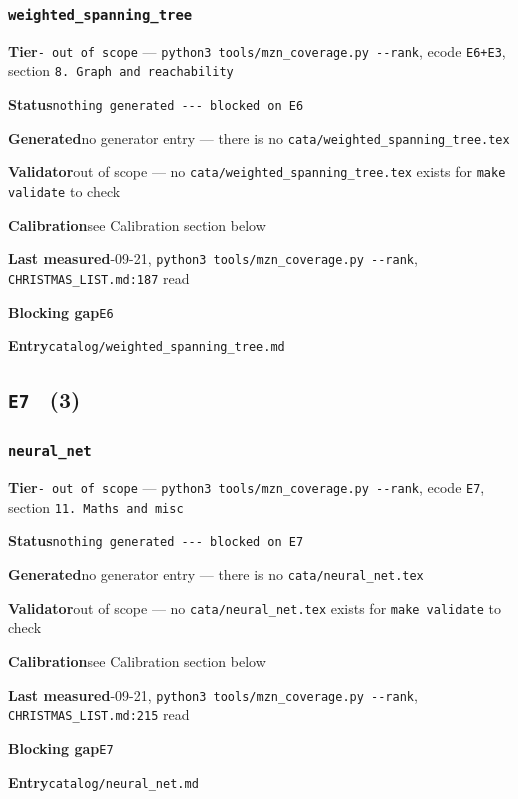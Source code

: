 \documentclass[10pt,a4paper]{article}
\newcommand{\entryfield}[2]{{\raggedright\textbf{#1}\quad #2\par}}
\begin{document}
\subsubsection*{\texttt{weighted\_\allowbreak{}spanning\_\allowbreak{}tree}}
\label{entry:weighted-spanning-tree}
\entryfield{Tier}{\texttt{- out of scope} --- \texttt{python3 tools/\allowbreak{}mzn\_\allowbreak{}coverage.\allowbreak{}py -\allowbreak{}-\allowbreak{}rank}, ecode \texttt{E6+E3}, section \texttt{8.\allowbreak{} Graph and reachability}}
\entryfield{Status}{\texttt{nothing generated -\allowbreak{}-\allowbreak{}-\allowbreak{} blocked on E6}}
\entryfield{Generated}{no generator entry --- there is no \texttt{cata/\allowbreak{}weighted\_\allowbreak{}spanning\_\allowbreak{}tree.\allowbreak{}tex}}
\entryfield{Validator}{out of scope --- no \texttt{cata/\allowbreak{}weighted\_\allowbreak{}spanning\_\allowbreak{}tree.\allowbreak{}tex} exists for \texttt{make validate} to check}
\entryfield{Calibration}{see Calibration section below}
\entryfield{Last measured}{2026-09-21, \texttt{python3 tools/\allowbreak{}mzn\_\allowbreak{}coverage.\allowbreak{}py -\allowbreak{}-\allowbreak{}rank}, \texttt{CHRISTMAS\_LIST.md:187} read}
\entryfield{Blocking gap}{\texttt{E6}}
\entryfield{Entry}{\texttt{catalog/weighted\_spanning\_tree.md}}
\subsection*{\texttt{E7} \ \normalsize(3)}
\subsubsection*{\texttt{neural\_\allowbreak{}net}}
\label{entry:neural-net}
\entryfield{Tier}{\texttt{- out of scope} --- \texttt{python3 tools/\allowbreak{}mzn\_\allowbreak{}coverage.\allowbreak{}py -\allowbreak{}-\allowbreak{}rank}, ecode \texttt{E7}, section \texttt{11. Maths and misc}}
\entryfield{Status}{\texttt{nothing generated -\allowbreak{}-\allowbreak{}-\allowbreak{} blocked on E7}}
\entryfield{Generated}{no generator entry --- there is no \texttt{cata/neural\_net.tex}}
\entryfield{Validator}{out of scope --- no \texttt{cata/neural\_net.tex} exists for \texttt{make validate} to check}
\entryfield{Calibration}{see Calibration section below}
\entryfield{Last measured}{2026-09-21, \texttt{python3 tools/\allowbreak{}mzn\_\allowbreak{}coverage.\allowbreak{}py -\allowbreak{}-\allowbreak{}rank}, \texttt{CHRISTMAS\_LIST.md:215} read}
\entryfield{Blocking gap}{\texttt{E7}}
\entryfield{Entry}{\texttt{catalog/neural\_net.md}}
\end{document}

